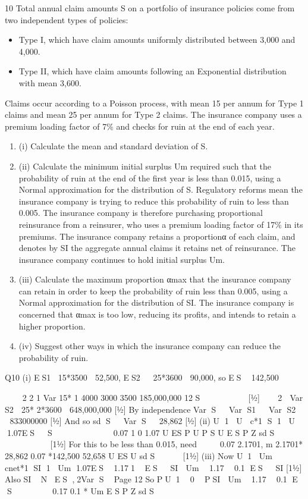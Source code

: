 \documentclass[a4paper,12pt]{article}
\begin{document}
10 Total annual claim amounts S on a portfolio of insurance policies come from two
independent types of policies:
\begin{itemize}
\item   Type I, which have claim amounts uniformly distributed between 3,000 and 4,000.
\item Type II, which have claim amounts following an Exponential distribution with mean 3,600.
\end{itemize}
Claims occur according to a Poisson process, with mean 15 per annum for Type 1 claims and mean 25 per annum for Type 2 claims.
The insurance company uses a premium loading factor of 7\% and checks for ruin at
the end of each year.
\begin{enumerate}
\item (i) Calculate the mean and standard deviation of S.
\item (ii) Calculate the minimum initial surplus Um required such that the probability of ruin at the end of the first year is less than 0.015, using a Normal approximation for the distribution of S. 
Regulatory reforms mean the insurance company is trying to reduce this probability of ruin to less than 0.005. The insurance company is therefore purchasing proportional reinsurance from a reinsurer, who uses a premium loading factor of 17\% in its
premiums.
The insurance company retains a proportionα of each claim, and denotes by SI the aggregate annual claims it retains net of reinsurance. The insurance company continues to hold initial surplus Um.
\item (iii) Calculate the maximum proportion αmax that the insurance company can retain
in order to keep the probability of ruin less than 0.005, using a Normal
approximation for the distribution of SI. 
The insurance company is concerned that αmax is too low, reducing its profits, and
intends to retain a higher proportion.
\item (iv) Suggest other ways in which the insurance company can reduce the
probability of ruin. 
\end{enumerate}
\newpage
  Q10 (i) ES1 15*3500  52,500, ES2   25*3600  90,000, so ES  142,500

   2 2
1
Var 15* 1 4000 3000 3500 185,000,000
12
S      
 
[½]
   2 
Var S2  25* 2*3600  648,000,000 [½]
By independence
Var S   Var S1   Var S2   833000000 [½]
And so sd S   Var S   28,862 [½]
(ii) U 1 U  c*1 S 1 U 1.07ES   S 
        
 
0.07
1 0 1.07
U ES
P U P S U E S P Z
sd S
  
       
 
[1½]
For this to be less than 0.015, need
 
 
0.07
2.1701, m 2.1701* 28,862 0.07 *142,500 52,658
U ES
U
sd S

    [1½]
(iii) Now
U1 Um  cnet*1 SI 1 Um 1.07ES  1.171 ES   SI 
Um  1.17  0.1 ES   SI [1½]
Also SI ~ N ES ,2Var S  
Page 12
So PU1  0  PSI  Um  1.17  0.1 E S 
   
 
0.17 0.1
*
  Um E S
P Z
sd S
        
  
\end{document}
